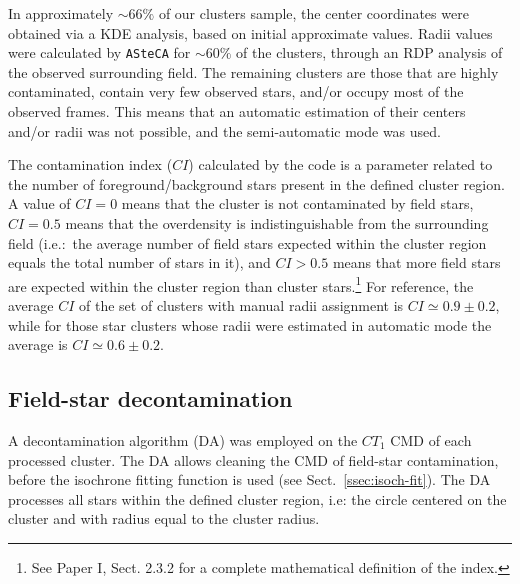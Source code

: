 \documentclass[draft]{aa}
\begin{document}
In approximately ${\sim}66\%$ of our clusters sample, the center coordinates
were obtained via a KDE analysis, based on initial approximate values. Radii
values were calculated by \texttt{ASteCA} for ${\sim}60\%$ of the clusters, through
an RDP analysis of the observed surrounding field.
%
The remaining clusters are those that are highly contaminated, contain very few
observed stars, and/or occupy most of the observed frames. This means that an
automatic estimation of their centers and/or radii was not possible, and the
semi-automatic mode was used.

The contamination index ($CI$) calculated by the code is a parameter related to
the number of foreground/background stars present in the defined cluster region.
A value of $CI{=}0$ means that the cluster is not contaminated by field stars,
$CI{=}0.5$ means that the overdensity is indistinguishable from the surrounding
field (i.e.:\ the average number of field stars expected within the cluster
region equals the total number of stars in it), and $CI{>}0.5$ means that more
field stars are expected within the cluster region than cluster
stars.\footnote{See Paper I, Sect. 2.3.2 for a complete mathematical
definition of the index.}
%
For reference, the average $CI$ of the set of clusters with manual radii
assignment is $CI{\simeq}0.9{\pm}0.2$, while for those star clusters whose
radii were estimated in automatic mode the average is $CI{\simeq}0.6\pm0.2$.



\subsection{Field-star decontamination}
\label{ssec:dencontamination}

A decontamination algorithm (DA) was employed on the $CT_1$ CMD of each
processed cluster. The DA allows cleaning the CMD of field-star contamination,
before the isochrone fitting function is used (see Sect.~\ref{ssec:isoch-fit}).
The DA processes all stars within the defined cluster region, i.e: the circle
centered on the cluster and with radius equal to the cluster radius.
\end{document}
